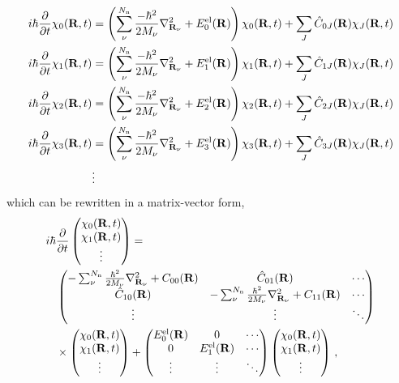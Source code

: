 \documentclass[9pt,bestpractices]{livecoms}
\begin{document}
\begin{align}
i\hbar\frac{\partial}{\partial t} \chi_0(\mathbf{R},t) & = \left(\sum_\nu^{N_{\text{n}}}\frac{-\hbar^2}{2M_\nu} \nabla_{\mathbf{R}_\nu}^2 + E^{\text{el}}_{0}(\mathbf{R})\right)\chi_0(\mathbf{R},t) + \sum_J \hat{C}_{0J}(\mathbf{R}) \chi_J(\mathbf{R},t) \notag \\
i\hbar\frac{\partial}{\partial t} \chi_1(\mathbf{R},t) & = \left(\sum_\nu^{N_{\text{n}}}\frac{-\hbar^2}{2M_\nu} \nabla_{\mathbf{R}_\nu}^2 + E^{\text{el}}_{1}(\mathbf{R})\right)\chi_1(\mathbf{R},t) + \sum_J \hat{C}_{1J}(\mathbf{R}) \chi_J(\mathbf{R},t) \notag \\
i\hbar\frac{\partial}{\partial t} \chi_2(\mathbf{R},t) & = \left(\sum_\nu^{N_{\text{n}}}\frac{-\hbar^2}{2M_\nu} \nabla_{\mathbf{R}_\nu}^2 + E^{\text{el}}_{2}(\mathbf{R})\right)\chi_2(\mathbf{R},t) + \sum_J \hat{C}_{2J}(\mathbf{R}) \chi_J(\mathbf{R},t) \notag \\
i\hbar\frac{\partial}{\partial t} \chi_3(\mathbf{R},t) & = \left(\sum_\nu^{N_{\text{n}}}\frac{-\hbar^2}{2M_\nu} \nabla_{\mathbf{R}_\nu}^2 + E^{\text{el}}_{3}(\mathbf{R})\right)\chi_3(\mathbf{R},t) + \sum_J \hat{C}_{3J}(\mathbf{R}) \chi_J(\mathbf{R},t) \notag \\
& \vdots
\end{align}
which can be rewritten in a matrix-vector form,
\begin{align} 
 i\hbar & \frac{\partial}{\partial t} 
     \begin{pmatrix}
        \chi_0(\mathbf{R},t)  \\
        \chi_1(\mathbf{R},t) \\
        \vdots
    \end{pmatrix} =  \notag \\
   & \begin{pmatrix}
        -\sum_\nu^{N_{\text{n}}}\frac{\hbar^2}{2M_\nu} \nabla_{\mathbf{R}_\nu}^2 + C_{00}(\mathbf{R})  & \hat{C}_{01}(\mathbf{R}) & \cdots \\
        \hat{C}_{10}(\mathbf{R}) & -\sum_\nu^{N_{\text{n}}}\frac{\hbar^2}{2M_\nu} \nabla_{\mathbf{R}_\nu}^2 + C_{11}(\mathbf{R}) & \cdots  \\
        \vdots & \vdots & \ddots
    \end{pmatrix}  \notag \\
    & \times \begin{pmatrix}
        \chi_0(\mathbf{R},t)  \\
        \chi_1(\mathbf{R},t) \\
        \vdots
    \end{pmatrix} + 
    \begin{pmatrix}
        E^{\text{el}}_{0}(\mathbf{R})   & 0 & \cdots \\
        0 & E^{\text{el}}_{1}(\mathbf{R})  & \cdots  \\
        \vdots & \vdots & \ddots
    \end{pmatrix} 
    \begin{pmatrix}
        \chi_0(\mathbf{R},t)  \\
        \chi_1(\mathbf{R},t) \\
        \vdots
    \end{pmatrix}
    \, ,
\label{eq:matrixtdse}
\end{align}
\end{document}
